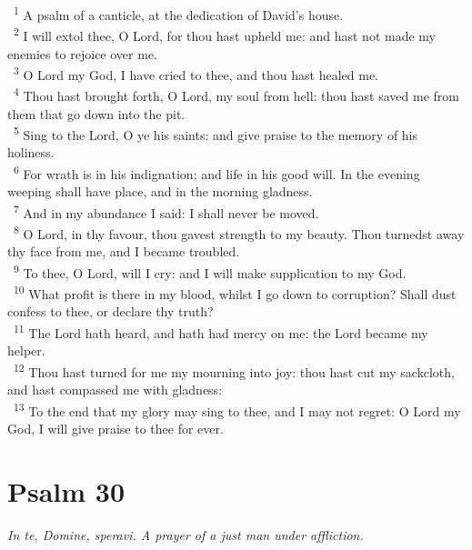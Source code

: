 \documentclass[a5paper,12pt]{article}
\begin{document}
\begin{multicols*}{2}
~\textsuperscript{1} A psalm of a canticle, at the dedication of David's house.\\
~\textsuperscript{2} I will extol thee, O Lord, for thou hast upheld me: and hast not made my enemies to rejoice over me.\\
~\textsuperscript{3} O Lord my God, I have cried to thee, and thou hast healed me.\\
~\textsuperscript{4} Thou hast brought forth, O Lord, my soul from hell: thou hast saved me from them that go down into the pit.\\
~\textsuperscript{5} Sing to the Lord, O ye his saints: and give praise to the memory of his holiness.\\
~\textsuperscript{6} For wrath is in his indignation; and life in his good will. In the evening weeping shall have place, and in the morning gladness.\\
~\textsuperscript{7} And in my abundance I said: I shall never be moved.\\
~\textsuperscript{8} O Lord, in thy favour, thou gavest strength to my beauty. Thou turnedst away thy face from me, and I became troubled.\\
~\textsuperscript{9} To thee, O Lord, will I cry: and I will make supplication to my God.\\
~\textsuperscript{10} What profit is there in my blood, whilst I go down to corruption? Shall dust confess to thee, or declare thy truth?\\
~\textsuperscript{11} The Lord hath heard, and hath had mercy on me: the Lord became my helper.\\
~\textsuperscript{12} Thou hast turned for me my mourning into joy: thou hast cut my sackcloth, and hast compassed me with gladness:\\
~\textsuperscript{13} To the end that my glory may sing to thee, and I may not regret: O Lord my God, I will give praise to thee for ever.\\

\section{Psalm 30}
\label{sec:org814c418}
\emph{In te, Domine, speravi. A prayer of a just man under affliction.}\\


\end{multicols*}
\end{document}
